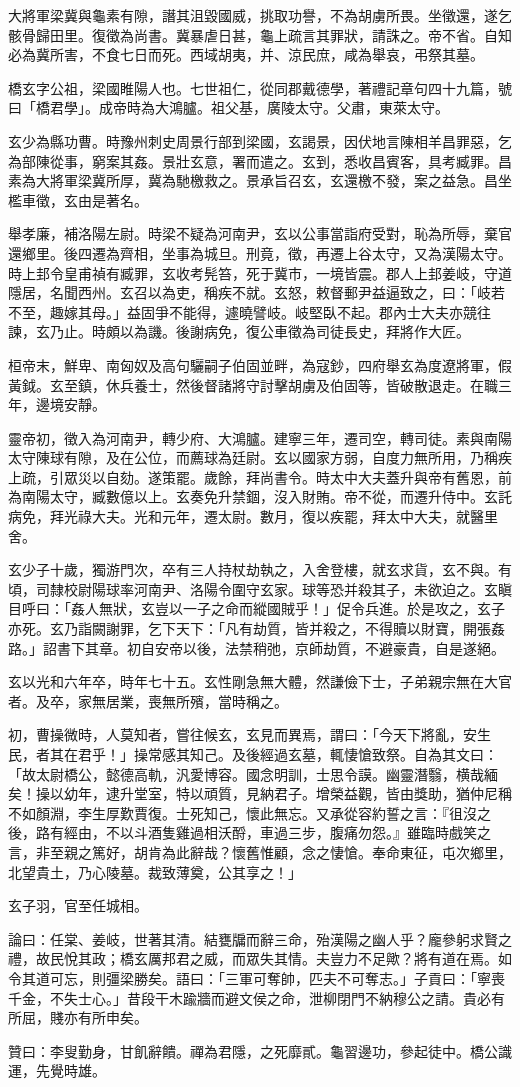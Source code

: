 \begin{pinyinscope}
大將軍梁冀與龜素有隙，譖其沮毀國威，挑取功譽，不為胡虜所畏。坐徵還，遂乞骸骨歸田里。復徵為尚書。冀暴虐日甚，龜上疏言其罪狀，請誅之。帝不省。自知必為冀所害，不食七日而死。西域胡夷，并、涼民庶，咸為舉哀，弔祭其墓。

橋玄字公祖，梁國睢陽人也。七世祖仁，從同郡戴德學，著禮記章句四十九篇，號曰「橋君學」。成帝時為大鴻臚。祖父基，廣陵太守。父肅，東萊太守。

玄少為縣功曹。時豫州刺史周景行部到梁國，玄謁景，因伏地言陳相羊昌罪惡，乞為部陳從事，窮案其姦。景壯玄意，署而遣之。玄到，悉收昌賓客，具考臧罪。昌素為大將軍梁冀所厚，冀為馳檄救之。景承旨召玄，玄還檄不發，案之益急。昌坐檻車徵，玄由是著名。

舉孝廉，補洛陽左尉。時梁不疑為河南尹，玄以公事當詣府受對，恥為所辱，棄官還鄉里。後四遷為齊相，坐事為城旦。刑竟，徵，再遷上谷太守，又為漢陽太守。時上邽令皇甫禎有臧罪，玄收考髡笞，死于冀巿，一境皆震。郡人上邽姜岐，守道隱居，名聞西州。玄召以為吏，稱疾不就。玄怒，敕督郵尹益逼致之，曰：「岐若不至，趣嫁其母。」益固爭不能得，遽曉譬岐。岐堅臥不起。郡內士大夫亦競往諫，玄乃止。時頗以為譏。後謝病免，復公車徵為司徒長史，拜將作大匠。

桓帝末，鮮卑、南匈奴及高句驪嗣子伯固並畔，為寇鈔，四府舉玄為度遼將軍，假黃鉞。玄至鎮，休兵養士，然後督諸將守討擊胡虜及伯固等，皆破散退走。在職三年，邊境安靜。

靈帝初，徵入為河南尹，轉少府、大鴻臚。建寧三年，遷司空，轉司徒。素與南陽太守陳球有隙，及在公位，而薦球為廷尉。玄以國家方弱，自度力無所用，乃稱疾上疏，引眾災以自劾。遂策罷。歲餘，拜尚書令。時太中大夫蓋升與帝有舊恩，前為南陽太守，臧數億以上。玄奏免升禁錮，沒入財賄。帝不從，而遷升侍中。玄託病免，拜光祿大夫。光和元年，遷太尉。數月，復以疾罷，拜太中大夫，就醫里舍。

玄少子十歲，獨游門次，卒有三人持杖劫執之，入舍登樓，就玄求貨，玄不與。有頃，司隸校尉陽球率河南尹、洛陽令圍守玄家。球等恐并殺其子，未欲迫之。玄瞋目呼曰：「姦人無狀，玄豈以一子之命而縱國賊乎！」促令兵進。於是攻之，玄子亦死。玄乃詣闕謝罪，乞下天下：「凡有劫質，皆并殺之，不得贖以財寶，開張姦路。」詔書下其章。初自安帝以後，法禁稍弛，京師劫質，不避豪貴，自是遂絕。

玄以光和六年卒，時年七十五。玄性剛急無大體，然謙儉下士，子弟親宗無在大官者。及卒，家無居業，喪無所殯，當時稱之。

初，曹操微時，人莫知者，嘗往候玄，玄見而異焉，謂曰：「今天下將亂，安生民，者其在君乎！」操常感其知己。及後經過玄墓，輒悽愴致祭。自為其文曰：「故太尉橋公，懿德高軌，汎愛博容。國念明訓，士思令謨。幽靈潛翳，横哉緬矣！操以幼年，逮升堂室，特以頑質，見納君子。增榮益觀，皆由獎助，猶仲尼稱不如顏淵，李生厚歎賈復。士死知己，懷此無忘。又承從容約誓之言：『徂沒之後，路有經由，不以斗酒隻雞過相沃酹，車過三步，腹痛勿怨。』雖臨時戲笑之言，非至親之篤好，胡肯為此辭哉？懷舊惟顧，念之悽愴。奉命東征，屯次鄉里，北望貴土，乃心陵墓。裁致薄奠，公其享之！」

玄子羽，官至任城相。

論曰：任棠、姜岐，世著其清。結甕牖而辭三命，殆漢陽之幽人乎？龐參躬求賢之禮，故民悅其政；橋玄厲邦君之威，而眾失其情。夫豈力不足歟？將有道在焉。如令其道可忘，則彊梁勝矣。語曰：「三軍可奪帥，匹夫不可奪志。」子貢曰：「寧喪千金，不失士心。」昔段干木踰牆而避文侯之命，泄柳閉門不納穆公之請。貴必有所屈，賤亦有所申矣。

贊曰：李叟勤身，甘飢辭饋。禪為君隱，之死靡貳。龜習邊功，參起徒中。橋公識運，先覺時雄。


\end{pinyinscope}